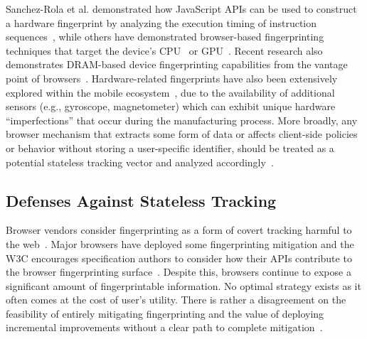 %
Sanchez-Rola et al. demonstrated how JavaScript APIs can be used to construct a hardware fingerprint by analyzing the execution timing of instruction sequences~\cite{sanchez-rolaClockClockTimeBased2018}, while others have demonstrated browser-based fingerprinting techniques that target the device's CPU~\cite{trampertBrowserBasedCPUFingerprinting2022,matyuninTrackingPrivateBrowsing2018} or GPU~\cite{laorDRAWNAPARTDevice2022}. 
%
Recent research also demonstrates DRAM-based device fingerprinting capabilities from the vantage point of browsers~\cite{venugopalanFPRowhammerDRAMBasedDevice2024}.
%
Hardware-related fingerprints have also been extensively explored within the mobile ecosystem~\cite{bojinovMobileDeviceIdentification2014,dasTrackingMobileWeb2016,marcantoniLargescaleStudyRisks2019,hupperichRobustnessMobileDevice2015,deyAccelPrintImperfectionsAccelerometers2014,zhang2019sensorid}, due to the availability of additional sensors (e.g., gyroscope, magnetometer) which can exhibit unique hardware ``imperfections'' that occur during the manufacturing process. 
%
%
More broadly, any browser mechanism that extracts some form of data or affects client-side policies or behavior without storing a user-specific identifier, should be treated as a potential stateless tracking vector and analyzed accordingly~\cite{aliNavigatingMurkyWaters2023}. 

\subsection{Defenses Against Stateless Tracking}
\label{sec:stateless-defenses}

Browser vendors consider fingerprinting as a form of covert tracking harmful to the web~\cite{nottinghamUnsanctionedWebTracking2015}. 
%
Major browsers have deployed some fingerprinting mitigation and the W3C encourages specification authors to consider how their APIs contribute to the browser fingerprinting surface~\cite{dotyMitigatingBrowserFingerprinting2019}. 
%
Despite this, browsers continue to expose a significant amount of fingerprintable information.
%
No optimal strategy exists as it often comes at the cost of user's utility. 
%
There is rather a disagreement on the feasibility of entirely mitigating fingerprinting and the value of deploying incremental improvements without a clear path to complete mitigation~\cite{snyderBraveFingerprintingPrivacy2019,rescorlaTechnicalCommentsPrivacy2021}. 
%

